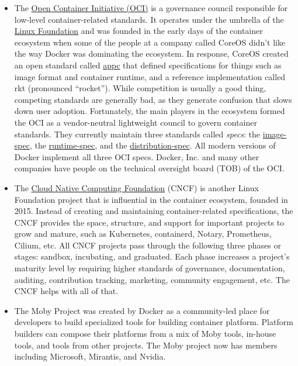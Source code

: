 \documentclass[8pt, table, xcdraw]{article}%
\begin{document}
\begin{itemize}
    \item The \href{https://opencontainers.org/}{Open Container Initiative (OCI)} is a governance council responsible for low-level container-related standards. It operates under the umbrella of the \href{https://www.linuxfoundation.org/projects}{Linux Foundation} and was founded in the early days of the container ecosystem when some of the people at a company called CoreOS didn’t like the way Docker was dominating the ecosystem. In response, CoreOS created an open standard called \href{https://github.com/appc/spec/}{appc} that defined specifications for things such as image format and container runtime, and a reference implementation called rkt (pronounced “rocket”). While competition is usually a good thing, competing standards are generally bad, as they generate confusion that slows down user adoption. Fortunately, the main players in the ecosystem formed the OCI as a vendor-neutral lightweight council to govern container standards. They currently maintain three standards called \emph{specs}: the \href{https://github.com/opencontainers/image-spec}{image-spec}, the \href{https://github.com/opencontainers/runtime-spec}{runtime-spec}, and the \href{https://github.com/opencontainers/distribution-spec}{distribution-spec}. All modern versions of Docker implement all three OCI specs. Docker, Inc. and many other companies have people on the technical oversight board (TOB) of the OCI.
    \item The \href{https://www.cncf.io/}{Cloud Native Computing Foundation} (CNCF) is another Linux Foundation project that is influential in the container ecosystem, founded in 2015. Instead of creating and maintaining container-related specifications, the CNCF provides the space, structure, and support for important projects to grow and mature, such as Kubernetes, containerd, Notary, Prometheus, Cilium, etc. All CNCF projects pass through the following three phases or stages: sandbox, incubating, and graduated. Each phase increases a project’s maturity level by requiring higher standards of governance, documentation, auditing, contribution tracking, marketing, community engagement, etc. The CNCF helps with all of that.
    \item The Moby Project was created by Docker as a community-led place for developers to build specialized tools for building container platform. Platform builders can compose their platforms from a mix of Moby tools, in-house tools, and tools from other projects. The Moby project now has members including Microsoft, Mirantis, and Nvidia.
\end{itemize}
\end{document}
